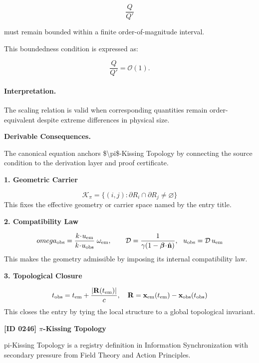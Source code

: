 \begin{equation}
\frac{Q}{Q'}
\end{equation}

must remain bounded within a finite order-of-magnitude interval.

This boundedness condition is expressed as:

\begin{equation}
\boxed{
\frac{Q}{Q'}
=
\mathcal{O}(1).
}
\end{equation}

\paragraph{Interpretation.}
The scaling relation is valid when corresponding quantities remain order-equivalent despite extreme differences in physical size.

\par\vspace{0.35em}
\noindent\textbf{Derivable Consequences.}\quad
\begingroup
\footnotesize
\raggedright
The canonical equation anchors \$\textbackslash{}pi\$-Kissing Topology by connecting the source condition to the derivation layer and proof certificate.
\par\endgroup

\noindent\textbf{1. Geometric Carrier}\par
\[
\mathcal{K}_{\pi}=\{(i,j):\partial R_i\cap\partial R_j\neq\varnothing\}
\]
\noindent This fixes the effective geometry or carrier space named by the entry title.\par
\noindent\textbf{2. Compatibility Law}\par
\[
omega_{\rm obs}= \frac{k\!\cdot\! u_{\rm em}}{k\!\cdot\! u_{\rm obs}}\;\omega_{\rm em},\qquad \mathcal D=\frac{1}{\gamma(1-\boldsymbol\beta\!\cdot\!\hat{\mathbf n})},\ \  u_{\rm obs}=\mathcal D\, u_{\rm em}
\]
\noindent This makes the geometry admissible by imposing its internal compatibility law.\par
\noindent\textbf{3. Topological Closure}\par
\[
t_{\rm obs}=t_{\rm em}+\frac{|\mathbf R(t_{\rm em})|}{c},\quad \mathbf R=\mathbf x_{\rm em}(t_{\rm em})-\mathbf x_{\rm obs}(t_{\rm obs})
\]
\noindent This closes the entry by tying the local structure to a global topological invariant.\par

\clearpage
\noindent\textbf{[ID 0246] $\pi$-Kissing Topology}\par
\vspace{0.35em}
\begingroup\small
{}
pi-Kissing Topology is a registry definition in Information Synchronization with secondary pressure from Field Theory and Action Principles.

